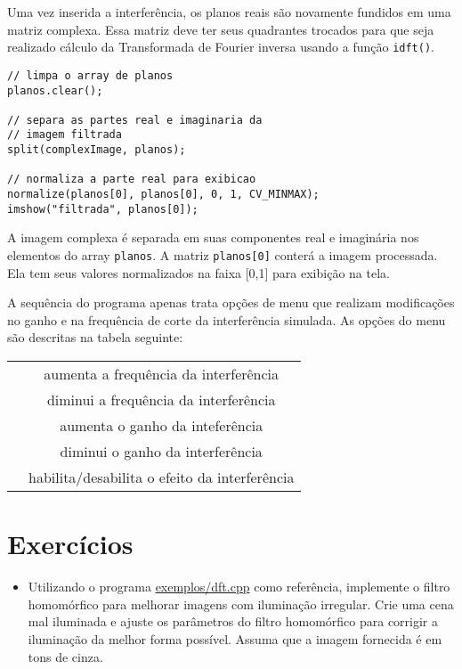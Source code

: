 \documentclass[11pt]{amsbook}
\begin{document}
Uma vez inserida a interferência, os planos reais são novamente
fundidos em uma matriz complexa. Essa matriz deve ter seus quadrantes
trocados para que seja realizado cálculo da Transformada de Fourier
inversa usando a função \texttt{idft()}.


\begin{verbatim}
// limpa o array de planos
planos.clear();

// separa as partes real e imaginaria da
// imagem filtrada
split(complexImage, planos);

// normaliza a parte real para exibicao
normalize(planos[0], planos[0], 0, 1, CV_MINMAX);
imshow("filtrada", planos[0]);
\end{verbatim}

A imagem complexa é separada em suas componentes real e imaginária nos
elementos do array \texttt{planos}. A matriz \texttt{planos[0]} conterá a imagem
processada. Ela tem seus valores normalizados na faixa [0,1]
para exibição na tela.


A sequência do programa apenas trata opções de menu que realizam
modificações no ganho e na frequência de corte da interferência
simulada. As opções do menu são descritas na tabela seguinte:


\begin{center}
\begin{tabular}{|c|c|}
\hline
 & aumenta a frequência da interferência \\ 
 & diminui a frequência da interferência \\ 
 & aumenta o ganho da inteferência \\ 
 & diminui o ganho da interferência \\ 
 & habilita/desabilita o efeito da interferência \\ 
\hline
\end{tabular}
\end{center}

\hypertarget{x-exercícios}{\section{Exercícios}}
\begin{itemize}

\item Utilizando o programa \href{exemplos/dft.cpp}{exemplos/dft.cpp} como referência,
implemente o filtro homomórfico para melhorar imagens com iluminação
irregular. Crie uma cena mal iluminada e ajuste os parâmetros do
filtro homomórfico para corrigir a iluminação da melhor forma
possível. Assuma que a imagem fornecida é em tons de cinza.

\end{itemize}
\end{document}
